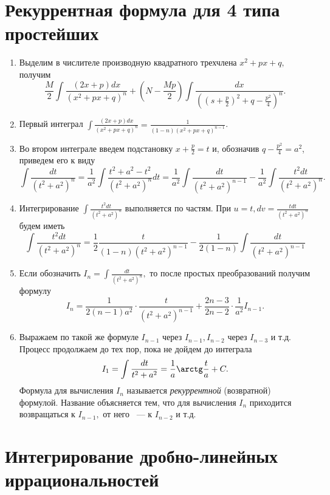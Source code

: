\documentclass[11pt]{article}
\begin{document}
	\section{Рекуррентная формула для 4 типа простейших}
	\begin{enumerate}
		\item Выделим в числителе производную квадратного трехчлена $x^2 + px + q,$ получим
		$$
			\frac{M}{2}\int\frac{(2x + p)dx}{(x^2 + px + q)^n} + \left(N - \frac{Mp}{2}\right)\int\frac{dx}{\left(\left(s + \frac{p}{2}\right)^2 + q - \frac{p^2}{4}\right)^n}.
		$$
		\item Первый интеграл $\int\frac{(2x + p)dx}{(x^2 + px + q)^n} = \frac{1}{(1 - n)(x^2 + px + q)^{n - 1}}$.
		\item Во втором интеграле введем подстановку $x + \frac{p}{2} = t$ и, обозначив $q - \frac{p^2}{4} = a^2$, приведем его к виду
		$$
			\int\frac{dt}{(t^2 + a^2)^n} = \frac{1}{a^2}\int\frac{t^2 + a^2 - t^2}{(t^2 + a^2)^n}dt = \frac{1}{a^2}\int\frac{dt}{(t^2 + a^2)^{n-1}}-\frac{1}{a^2}\int\frac{t^2dt}{(t^2 + a^2)^n}.
		$$
		\item Интегрирование $\int\frac{t^2dt}{(t^2 + a^2)^n}$ выполняется по частям. При $u = t, dv = \frac{tdt}{(t^2 + a^2)^n}$ будем иметь
		$$
			\int\frac{t^2dt}{(t^2 + a^2)^n} = \frac{1}{2}\frac{t}{(1 - n)(t^2 + a^2)^{n - 1}} - \frac{1}{2(1 - n)}\int\frac{dt}{(t^2 + a^2)^{n - 1}}
		$$
		\item Если обозначить $I_n = \int\frac{dt}{(t^2 + a^2)^n},$ то после простых преобразований получим формулу
		$$
			I_n = \frac{1}{2(n - 1)a^2}\cdot\frac{t}{(t^2 + a^2)^{n - 1}} + \frac{2n - 3}{2n - 2}\cdot\frac{1}{a^2}I_{n - 1}.
		$$
		\item Выражаем по такой же формуле $I_{n-1}$ через $I_{n - 1}, I_{n - 2}$ через $I_{n - 3}$ и т.д. Процесс продолжаем до тех пор, пока не дойдем до интеграла
		$$
			I_1 = \int\frac{dt}{t^2 + a^2} = \frac{1}{a}\arctg\frac{t}{a} + C.
		$$
		Формула для вычисления $I_n$ называется \textit{рекуррентной} (возвратной) формулой. Название объясняется тем, что для вычисления $I_n$ приходится возвращаться к $I_{n - 1},$ от него ~--- к $I_{n - 2}$ и т.д.
	\end{enumerate}
	\section{Интегрирование дробно-линейных иррациональностей}
\end{document}
